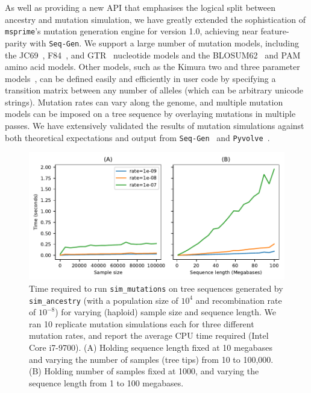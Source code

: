 \documentclass{article}
\newcommand{\msprime}[0]{\texttt{msprime}}
\newcommand{\SeqGen}[0]{\texttt{Seq-Gen}}
\newcommand{\Pyvolve}[0]{\texttt{Pyvolve}}
\begin{document}
As well as providing a new API
that emphasises the logical split between ancestry and mutation simulation,
we have greatly extended the sophistication of
\msprime's mutation generation engine for version 1.0,
achieving near feature-parity with \SeqGen.
We support a large number of mutation models, including the
JC69~\citep{jukes1969evolution},
F84~\citep{felsenstein1996hidden},
and GTR~\citep{tavare1986some} nucleotide models
and the BLOSUM62~\citep{henikoff1992amino}
and PAM~\citep{dayhoff1978} amino acid models.
Other models, such as the Kimura two and three
parameter models~\citep{kimura1980simple,kimura1981estimation},
can be defined easily and efficiently in
user code by specifying a transition matrix between
any number of alleles (which can be arbitrary unicode strings).
Mutation rates can vary along the genome, and multiple mutation
models can be imposed on a tree sequence by overlaying mutations
in multiple passes.
We have extensively validated the results of mutation simulations
against both theoretical expectations and output from
\SeqGen~\citep{rambaut1997seq} and
\Pyvolve~\citep{spielman2015pyvolve}.

\begin{figure}
    \includegraphics{figures/mutations-perf}
\caption{\label{fig-mutations-perf} Time required to run
\texttt{sim\_mutations} on tree sequences generated
by \texttt{sim\_ancestry} (with a population size of $10^4$
and recombination rate of $10^{-8}$) for varying (haploid) sample
size and sequence length. We ran 10 replicate mutation simulations
each for three different mutation rates, and report the average
CPU time required (Intel Core i7-9700).
(A) Holding sequence length fixed at 10 megabases and varying the
number of samples (tree tips) from 10 to 100,000.
(B) Holding number of samples fixed at 1000, and varying the sequence
length from 1 to 100 megabases.}
\end{figure}
\end{document}

